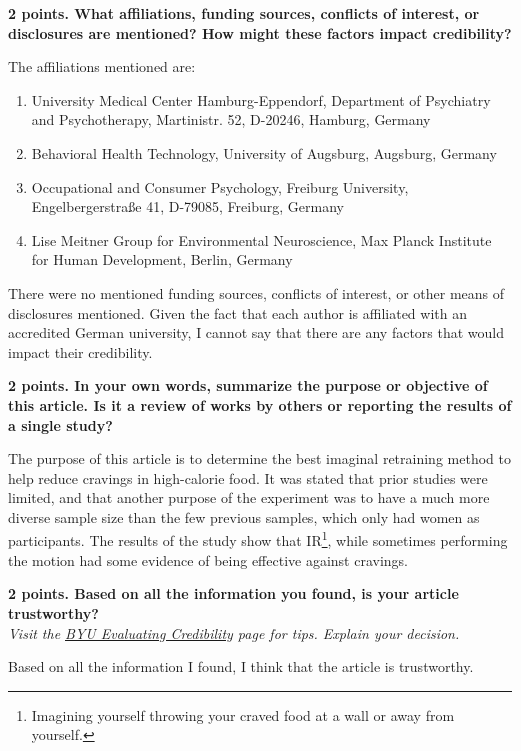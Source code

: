 \documentclass[title={Credible Sources - Literature Review and Article Selection},points={30}]{fdsn201homework}
\let\oldhref\href
\renewcommand{\href}[2]{\oldhref{#1}{\underline{#2}}}
\begin{document}
\begin{problems}
\begin{answer}
	\end{answer}
	\item \textbf{2 points. What affiliations, funding sources, conflicts of interest, or disclosures are mentioned?
	How might these factors impact credibility?}
	\begin{answer}%
		The affiliations mentioned are:
		\begin{enumerate}[label=\alph*]
		    \item University Medical Center Hamburg-Eppendorf, Department of Psychiatry and Psychotherapy, Martinistr. 52, D-20246, Hamburg, Germany
			\item Behavioral Health Technology, University of Augsburg, Augsburg, Germany
			\item Occupational and Consumer Psychology, Freiburg University, Engelbergerstraße 41, D-79085, Freiburg, Germany
			\item Lise Meitner Group for Environmental Neuroscience, Max Planck Institute for Human Development, Berlin, Germany
		\end{enumerate}
		There were no mentioned funding sources, conflicts of interest, or other means of disclosures mentioned.
		Given the fact that each author is affiliated with an accredited German university, I cannot say that there are any factors that would impact their credibility.
	\end{answer}
	\item \textbf{2 points. In your own words, summarize the purpose or objective of this article.
	Is it a review of works by others or reporting the results of a single study?}
	\begin{answer}%
		The purpose of this article is to determine the best imaginal retraining method to help reduce cravings in high-calorie food.
		It was stated that prior studies were limited, and that another purpose of the experiment was to have a much more diverse sample size than the few previous samples, which only had women as participants.
		The results of the study show that IR\footnote{Imagining yourself throwing your craved food at a wall or away from yourself.},
		while sometimes performing the motion had some evidence of being effective against cravings.
	\end{answer}
	\item \textbf{2 points. Based on all the information you found, is your article trustworthy?}\\
	\emph{Visit the \href{https://guides.lib.byu.edu/c.php?g=216340&p=1428399}{BYU Evaluating Credibility} page for tips.
	Explain your decision.}
	\begin{answer}%
		Based on all the information I found, I think that the article is trustworthy.
	\end{answer}
\end{problems}

\let\href\oldhref
\end{document}
